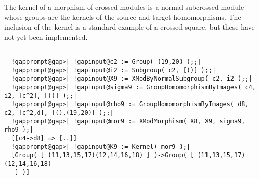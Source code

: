\documentclass[a4paper,11pt]{report}
\begin{document}
{{{ The kernel of a morphism of crossed modules is a normal subcrossed module
whose groups are the kernels of the source and target homomorphisms. The
inclusion of the kernel is a standard example of a crossed square, but these
have not yet been implemented. }

 
\begin{Verbatim}[commandchars=!@|,fontsize=\small,frame=single,label=Example]
  
  !gapprompt@gap>| !gapinput@c2 := Group( (19,20) );;|
  !gapprompt@gap>| !gapinput@i2 := Subgroup( c2, [()] );;|
  !gapprompt@gap>| !gapinput@X9 := XModByNormalSubgroup( c2, i2 );;|
  !gapprompt@gap>| !gapinput@sigma9 := GroupHomomorphismByImages( c4, i2, [c^2], [()] );;|
  !gapprompt@gap>| !gapinput@rho9 := GroupHomomorphismByImages( d8, c2, [c^2,d], [(),(19,20)] );;|
  !gapprompt@gap>| !gapinput@mor9 := XModMorphism( X8, X9, sigma9, rho9 );|
  [[c4->d8] => [..]]
  !gapprompt@gap>| !gapinput@K9 := Kernel( mor9 );|
  [Group( [ (11,13,15,17)(12,14,16,18) ] )->Group( [ (11,13,15,17)(12,14,16,18)
   ] )]
\end{Verbatim}
 }

 }

            
\end{document}

